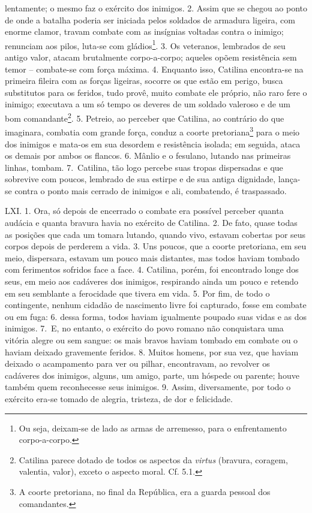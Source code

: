 lentamente; o mesmo faz o exército dos inimigos. 2. Assim que se chegou ao
ponto de onde a batalha poderia ser iniciada pelos soldados de armadura
ligeira, com enorme clamor, travam combate com as insígnias voltadas contra o
inimigo; renunciam aos pilos, luta-se com gládios\footnote{Ou seja, deixam-se
de lado as armas de arremesso, para o enfrentamento corpo-a-corpo.}. 3. Os
veteranos, lembrados de seu antigo valor, atacam brutalmente corpo-a-corpo;
aqueles opõem resistência sem temor -- combate-se com força máxima. 4.
Enquanto isso, Catilina encontra-se na primeira fileira com as forças ligeiras,
socorre os que estão em perigo, busca substitutos para os feridos, tudo provê,
muito combate ele próprio, não raro fere o inimigo; executava a um só tempo os
deveres de um soldado valeroso e de um bom comandante\footnote{Catilina parece
dotado de todos os aspectos da \emph{virtus} (bravura, coragem, valentia,
valor), exceto o aspecto moral. Cf. 5.1.}. 5. Petreio, ao perceber que
Catilina, ao contrário do que imaginara, combatia com grande força, conduz a
coorte pretoriana\footnote{A coorte pretoriana, no final da República, era a
guarda pessoal dos comandantes.} para o meio dos inimigos e mata-os em sua
desordem e resistência isolada; em seguida, ataca os demais por ambos os
flancos. 6. Mânlio e o fesulano, lutando nas primeiras linhas, tombam. 7.~Catilina,
tão logo percebe suas tropas dispersadas e que sobrevive com poucos,
lembrado de sua estirpe e de sua antiga dignidade, lança-se contra o ponto mais
cerrado de inimigos e ali, combatendo, é traspassado. 

LXI. 1. Ora, só depois de encerrado o combate era possível perceber quanta
audácia e quanta bravura havia no exército de Catilina. 2. De fato, quase todas
as posições que cada um tomara lutando, quando vivo, estavam cobertas por seus
corpos depois de perderem a vida. 3. Uns poucos, que a coorte pretoriana, em
seu meio, dispersara, estavam um pouco mais distantes, mas todos haviam tombado
com ferimentos sofridos face a face. 4. Catilina, porém, foi encontrado longe
dos seus, em meio aos cadáveres dos inimigos, respirando ainda um pouco e
retendo em seu semblante a ferocidade que tivera em vida. 5. Por fim, de todo o
contingente, nenhum cidadão de nascimento livre foi capturado, fosse em combate
ou em fuga: 6. dessa forma, todos haviam igualmente poupado suas vidas e as dos
inimigos. 7.~E, no entanto, o exército do povo romano não conquistara uma
vitória alegre ou sem sangue: os mais bravos haviam tombado em combate ou o
haviam deixado gravemente feridos. 8. Muitos homens, por sua vez, que haviam
deixado o acampamento para ver ou pilhar, encontravam, ao revolver os cadáveres
dos inimigos, alguns, um amigo, parte, um hóspede ou parente; houve também quem
reconhecesse seus inimigos. 9. Assim, diversamente, por todo o exército era-se
tomado de alegria, tristeza, de dor e felicidade. 

